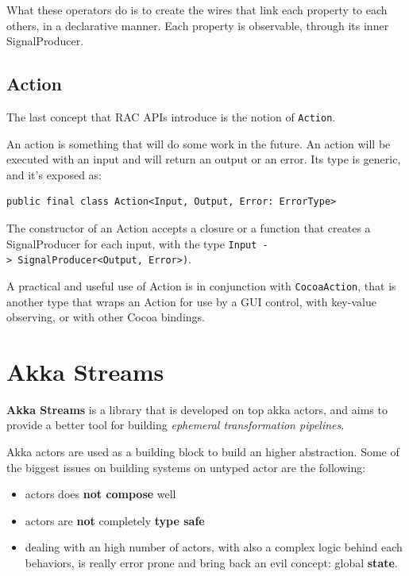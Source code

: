 What these operators do is to create the wires that link each property
to each others, in a declarative manner. Each property is observable,
through its inner SignalProducer.


\subsection{Action}\label{action}

The last concept that RAC APIs introduce is the notion of
\texttt{Action}.

An action is something that will do some work in the future. An action
will be executed with an input and will return an output or an error.
Its type is generic, and it's exposed as:

\begin{verbatim}
public final class Action<Input, Output, Error: ErrorType>
\end{verbatim}

The constructor of an Action accepts a closure or a function that
creates a SignalProducer for each input, with the type
\texttt{Input\ -\textgreater{}\ SignalProducer\textless{}Output,\ Error\textgreater{})}.

A practical and useful use of Action is in conjunction with
\texttt{CocoaAction}, that is another type that wraps an Action for use
by a GUI control, with key-value observing, or with other Cocoa
bindings.


\section{Akka Streams}\label{akka-streams}

\textbf{Akka Streams} is a library that is developed on top akka actors,
and aims to provide a better tool for building \emph{ephemeral
transformation pipelines}.

Akka actors are used as a building block to build an higher abstraction.
Some of the biggest issues on building systems on untyped actor are the
following:

\begin{itemize}
\itemsep1pt\parskip0pt
\item
  actors does \textbf{not compose} well
\item
  actors are \textbf{not} completely \textbf{type safe}
\item
  dealing with an high number of actors, with also a complex logic
  behind each behaviors, is really error prone and bring back an evil
  concept: global \textbf{state}.
\end{itemize}

